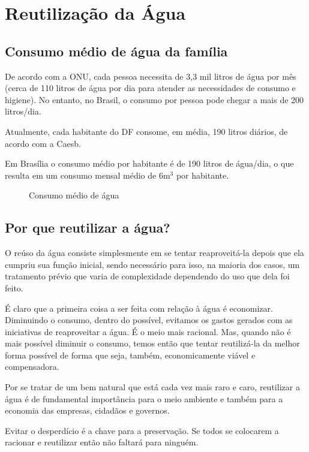 \section{Reutilização da Água}
\subsection{Consumo médio de água da família}

	De acordo com a ONU, cada pessoa necessita de 3,3 mil litros de água por mês (cerca de 110 litros de água por dia para atender as necessidades de consumo e higiene). No entanto, no Brasil, o consumo por pessoa pode chegar a mais de 200 litros/dia.

	Atualmente, cada habitante do DF consome, em média, 190 litros diários, de acordo com a Caesb.

	Em Brasília o consumo médio por habitante é de 190 litros de água/dia, o que resulta em um consumo mensal médio de 6m$^{3}$ por habitante.
\begin{figure}
\centering
\caption{Consumo médio de água \cite{table1}}

\end{figure}

\subsection{Por que reutilizar a água?}

	O reúso da água consiste simplesmente em se tentar reaproveitá-la depois que ela cumpriu sua função inicial, sendo necessário para isso, na maioria dos casos, um tratamento prévio que varia de complexidade dependendo do uso que dela foi feito.

	É claro que a primeira coisa a ser feita com relação à água é economizar. Diminuindo o consumo, dentro do possível, evitamos os gastos gerados com as iniciativas de reaproveitar a água. É o meio mais racional. Mas, quando não é mais possível diminuir o consumo, temos então que tentar reutilizá-la da melhor forma possível de forma que seja, também, economicamente viável e compensadora.

	Por se tratar de um bem natural que está cada vez mais raro e caro,
reutilizar a água é de fundamental importância para o meio ambiente e também
para a economia das empresas, cidadãos e governos.

Evitar o desperdício é a chave para a preservação. Se todos se colocarem a racionar e reutilizar então não faltará para ninguém.

